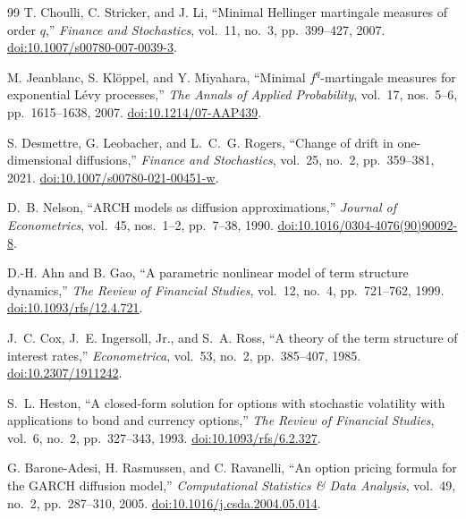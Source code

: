 \documentclass[11pt,a4paper]{article}
\newcommand{\doi}[1]{\href{https://doi.org/#1}{doi:#1}}
\begin{document}
\begin{thebibliography}{99}
T. Choulli, C. Stricker, and J. Li,
\textquotedblleft Minimal Hellinger martingale measures of order
$q$,\textquotedblright
\emph{Finance and Stochastics}, vol.~11, no.~3, pp.~399--427, 2007.
\doi{10.1007/s00780-007-0039-3}.

M. Jeanblanc, S. Kl\"oppel, and Y. Miyahara,
\textquotedblleft Minimal $f^q$-martingale measures for exponential
L\'evy processes,\textquotedblright
\emph{The Annals of Applied Probability},
vol.~17, nos.~5--6, pp.~1615--1638, 2007.
\doi{10.1214/07-AAP439}.

S. Desmettre, G. Leobacher, and L.~C.~G. Rogers,
\textquotedblleft Change of drift in one-dimensional
diffusions,\textquotedblright
\emph{Finance and Stochastics}, vol.~25, no.~2, pp.~359--381, 2021.
\doi{10.1007/s00780-021-00451-w}.

D.~B. Nelson,
``ARCH models as diffusion approximations,''
\emph{Journal of Econometrics}, vol.~45, nos.~1--2, pp.~7--38, 1990.
\doi{10.1016/0304-4076(90)90092-8}.

D.-H. Ahn and B. Gao,
``A parametric nonlinear model of term structure dynamics,''
\emph{The Review of Financial Studies},
vol.~12, no.~4, pp.~721--762, 1999.
\doi{10.1093/rfs/12.4.721}.

J.~C. Cox, J.~E. Ingersoll, Jr., and S.~A. Ross,
``A theory of the term structure of interest rates,''
\emph{Econometrica}, vol.~53, no.~2, pp.~385--407, 1985.
\doi{10.2307/1911242}.

S.~L. Heston,
``A closed-form solution for options with stochastic volatility with
applications to bond and currency options,''
\emph{The Review of Financial Studies},
vol.~6, no.~2, pp.~327--343, 1993.
\doi{10.1093/rfs/6.2.327}.

G. Barone-Adesi, H. Rasmussen, and C. Ravanelli,
``An option pricing formula for the GARCH diffusion model,''
\emph{Computational Statistics \& Data Analysis},
vol.~49, no.~2, pp.~287--310, 2005.
\doi{10.1016/j.csda.2004.05.014}.

\end{thebibliography}
\end{document}
